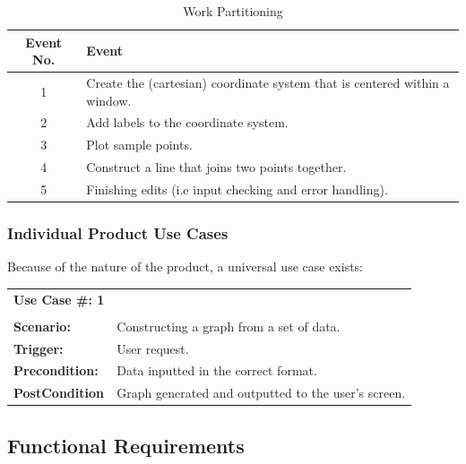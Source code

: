 \documentclass[12pt, titlepage]{article}
\begin{document}
\begin{center}
\begin{table}[!hpb]
    \caption{Work Partitioning} 
    \begin{tabular}{ |c|p{11cm}|}
	\hline
	Event No. & Event\\ \hline
	1 & Create the (cartesian) coordinate system that is centered within a window.\\ \hline
	2 & Add labels to the coordinate system. \\ \hline
	3 & Plot sample points.\\ \hline
	4 & Construct a line that joins two points together.\\ \hline
	5 & Finishing edits (i.e input checking and error handling).\\ \hline
    \end{tabular}

\end{table}
\end{center}

\subsubsection{Individual Product Use Cases}

Because of the nature of the product, a universal use case exists: 

\begin{reqbox}
    \begin{tabular}{l p{10cm}}

	\bf{Use Case \#: 1} & \\
	 & \\
	{\bfseries Scenario: } 	& 	Constructing a graph from a set of data.	\\
	{\bfseries Trigger: }   		& 	User request. 					\\
	{\bfseries Precondition: } 	&	Data inputted in the correct format.		\\
	{\bfseries PostCondition } 	& 	Graph generated and outputted to the user's screen.				\\

    \end{tabular}
\end{reqbox}


\subsection{Functional Requirements}
\end{document}
